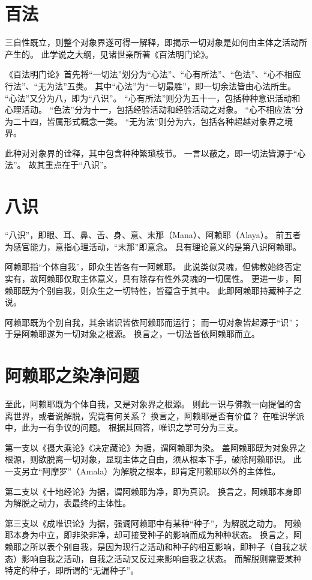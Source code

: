 \documentclass[11pt]{article}
\begin{document}
\section{百法}
三自性既立，则整个对象界遂可得一解释，即揭示一切对象是如何由主体之活动所产生的。
此学说之大纲，见诸世亲所著《百法明门论》。

\par

《百法明门论》首先将“一切法”划分为“心法”、“心有所法”、“色法”、“心不相应行法”、“无为法”五类。
其中“心法”为“一切最胜”，即一切余法皆由心法所生。
“心法”又分为八，即为“八识”。
“心有所法”则分为五十一，包括种种意识活动和心理活动。
“色法”分为十一，包括经验活动和经验活动之对象。
“心不相应法”分为二十四，皆属形式概念一类。
“无为法”则分为六，包括各种超越对象界之境界。

\par

此种对对象界的诠释，其中包含种种繁琐枝节。
一言以蔽之，即一切法皆源于“心法”。
故其重点在于“八识”。

\section{八识}
“八识”，即眼、耳、鼻、舌、身、意、末那（Mana）、阿赖耶（Alaya）。
前五者为感官能力，意指心理活动，“末那”即意念。
具有理论意义的是第八识阿赖耶。

\par

阿赖耶指“个体自我”，即众生皆各有一阿赖耶。
此说类似灵魂，但佛教始终否定实有，故阿赖耶仅取主体意义，具有除存有性外灵魂的一切属性。
更进一步，阿赖耶既为个别自我，则众生之一切特性，皆蕴含于其中。
此即阿赖耶持藏种子之说。

\par

阿赖耶既为个别自我，其余诸识皆依阿赖耶而运行；
而一切对象皆起源于“识”；
于是阿赖耶遂为一切对象之根源。
换言之，一切法皆依阿赖耶而立。

\section{阿赖耶之染净问题}
至此，阿赖耶既为个体自我，又是对象界之根源。
则此一识与佛教一向提倡的舍离世界，或者说解脱，究竟有何关系？
换言之，阿赖耶是否有价值？
在唯识学派中，此为一有争议的问题。
根据其回答，唯识之学可分为三支。

\par

第一支以《摄大乘论》《决定藏论》为据，谓阿赖耶为染。
盖阿赖耶既为对象界之根源，则欲脱离一切对象，显现主体之自由，须从根本下手，破除阿赖耶识。
此一支另立“阿摩罗”（Amala）为解脱之根本，即肯定阿赖耶以外的主体性。

\par

第二支以《十地经论》为据，谓阿赖耶为净，即为真识。
换言之，阿赖耶本身即为解脱之动力，表最终的主体性。

\par

第三支以《成唯识论》为据，强调阿赖耶中有某种“种子”，为解脱之动力。
阿赖耶本身为中立，即非染非净，却可接受种子的影响而成为种种状态。
换言之，阿赖耶之所以表个别自我，是因为现行之活动和种子的相互影响，即种子（自我之状态）影响自我之活动，自我之活动又反过来影响自我之状态。
而解脱则需要某种特定的种子，即所谓的“无漏种子”。  
  
\end{document}
